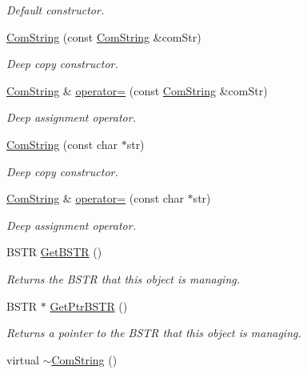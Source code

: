 \begin{DoxyCompactItemize}
\begin{DoxyCompactList}\small\item\em Default constructor. \item\end{DoxyCompactList}\item 
\hyperlink{class_com_string_af5db5737c393d0451b8eac4068d589d3}{ComString} (const \hyperlink{class_com_string}{ComString} \&comStr)
\begin{DoxyCompactList}\small\item\em Deep copy constructor. \item\end{DoxyCompactList}\item 
\hyperlink{class_com_string}{ComString} \& \hyperlink{class_com_string_acca04f610cdc5d076e780778a3f2a782}{operator=} (const \hyperlink{class_com_string}{ComString} \&comStr)
\begin{DoxyCompactList}\small\item\em Deep assignment operator. \item\end{DoxyCompactList}\item 
\hyperlink{class_com_string_a693a5815ef9e5b0edb664c60c75eba7d}{ComString} (const char $\ast$str)
\begin{DoxyCompactList}\small\item\em Deep copy constructor. \item\end{DoxyCompactList}\item 
\hyperlink{class_com_string}{ComString} \& \hyperlink{class_com_string_ab8d24de6675f8032e0cba16cf71706e7}{operator=} (const char $\ast$str)
\begin{DoxyCompactList}\small\item\em Deep assignment operator. \item\end{DoxyCompactList}\item 
BSTR \hyperlink{class_com_string_a1e6912aa7c93ba2ab8beee0f88c933bc}{GetBSTR} ()
\begin{DoxyCompactList}\small\item\em Returns the BSTR that this object is managing. \item\end{DoxyCompactList}\item 
BSTR $\ast$ \hyperlink{class_com_string_a230136a99d7eb46de96477739aca5710}{GetPtrBSTR} ()
\begin{DoxyCompactList}\small\item\em Returns a pointer to the BSTR that this object is managing. \item\end{DoxyCompactList}\item 
\hypertarget{class_com_string_af6c7f8dbef903c089c62096f80335c34}{
virtual \hyperlink{class_com_string_af6c7f8dbef903c089c62096f80335c34}{$\sim$ComString} ()}
\label{class_com_string_af6c7f8dbef903c089c62096f80335c34}


\end{DoxyCompactItemize}
